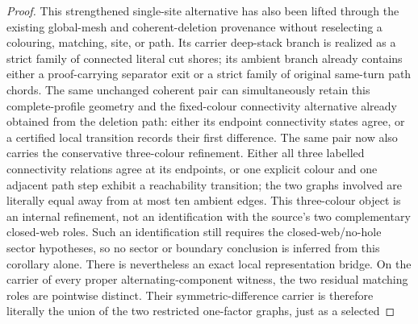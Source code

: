 \begin{proof}
This strengthened single-site alternative has also been lifted through the
existing global-mesh and coherent-deletion provenance without reselecting a
colouring, matching, site, or path.  Its carrier deep-stack branch is
realized as a strict family of connected literal cut shores; its ambient
branch already contains either a proof-carrying separator exit or a strict
family of original same-turn path chords.
The same unchanged coherent pair can simultaneously retain this complete-profile
geometry and the fixed-colour connectivity alternative already obtained from the
deletion path: either its endpoint connectivity states agree, or a certified
local transition records their first difference.
The same pair now also carries the conservative three-colour refinement.  Either
all three labelled connectivity relations agree at its endpoints, or one
explicit colour and one adjacent path step exhibit a reachability transition;
the two graphs involved are literally equal away from at most ten ambient
edges.
This three-colour object is an internal refinement, not an identification with
the source's two complementary closed-web roles.  Such an identification still
requires the closed-web/no-hole sector hypotheses, so no sector or boundary
conclusion is inferred from this corollary alone.
There is nevertheless an exact local representation bridge.  On the carrier of
every proper alternating-component witness, the two residual matching roles
are pointwise distinct.  Their symmetric-difference carrier is therefore
literally the union of the two restricted one-factor graphs, just as a selected

\end{proof}

